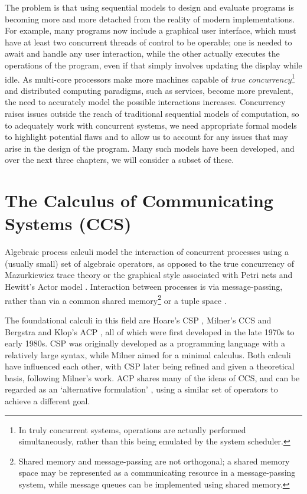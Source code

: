 The problem is that using sequential models to design and evaluate
programs is becoming more and more detached from the reality of modern
implementations.  For example, many programs now include a graphical
user interface, which must have at least two concurrent threads of
control to be operable; one is needed to await and handle any user
interaction, while the other actually executes the operations of the
program, even if that simply involves updating the display while idle.
As multi-core processors make more machines capable of \emph{true
  concurrency}\footnote{In truly concurrent systems, operations are
  actually performed simultaneously, rather than this being emulated
  by the system scheduler.} and distributed computing paradigms, such
as services, become more prevalent, the need to accurately model the
possible interactions increases.  Concurrency raises issues outside
the reach of traditional sequential models of computation, so to
adequately work with concurrent systems, we need appropriate formal
models to highlight potential flaws and to allow us to account for any
issues that may arise in the design of the program.  Many such models
have been developed, and over the next three chapters, we will
consider a subset of these.

\section{The Calculus of Communicating Systems (CCS)}
\label{ccs}

Algebraic process calculi model the interaction of concurrent
processes using a (usually small) set of algebraic operators, as
opposed to the true concurrency of Mazurkiewicz trace theory
\cite*{maz:trace} or the graphical style associated with Petri nets
\cite*{petri:phd} and Hewitt's Actor model \cite*{hewitt:actor}.
Interaction between processes is via message-passing, rather than via
a common shared memory\footnote{Shared memory and message-passing are
  not orthogonal; a shared memory space may be represented as a
  communicating resource in a message-passing system, while message
  queues can be implemented using shared memory.} or a tuple space
\cite*{linda}.

The foundational calculi in this field are Hoare's CSP
\cite*{hoare:csp78}, Milner's CCS \cite*{milner:ccs} and Bergstra and
Klop's ACP \cite*{acp}, all of which were first developed in the late
1970s to early 1980s.  CSP was originally developed as a programming
language with a relatively large syntax, while Milner aimed for a
minimal calculus.  Both calculi have influenced each other, with CSP
later being refined and given a theoretical basis, following Milner's
work.  ACP shares many of the ideas of CCS, and can be regarded as an
`alternative formulation' \cite{acp}, using a similar set of operators
to achieve a different goal.

